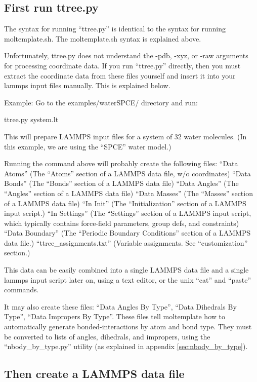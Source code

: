 \documentclass[11pt]{article}
\begin{document}
\subsection{First run ttree.py}

The syntax for running ``ttree.py'' is identical to the syntax for running
moltemplate.sh.  The moltemplate.sh syntax is explained above.

Unfortunately, ttree.py does not understand the -pdb, -xyz, or -raw arguments
for processing coordinate data.  If you run ``ttree.py'' directly, then you
must extract the coordinate data from these files yourself and insert it into 
your lammps input files manually.  This is explained below.

Example:
Go to the examples/waterSPCE/ directory and run:

ttree.py system.lt

This will prepare LAMMPS input files for a system of 32 water molecules.
(In this example, we are using the ``SPCE'' water model.)

Running the command above will probably create the following files:
``Data Atoms''  (The ``Atoms'' section of a LAMMPS data file, w/o coordinates)
``Data Bonds''  (The ``Bonds'' section of a LAMMPS data file)
``Data Angles'' (The ``Angles'' section of a LAMMPS data file)
``Data Masses'' (The ``Masses'' section of a LAMMPS data file)
``In Init''   (The ``Initialization'' section of a LAMMPS input script.)
``In Settings'' (The ``Settings'' section of a LAMMPS input script, which typically
            contains force-field parameters, group defs, and constraints)
``Data Boundary''    (The ``Periodic Boundary Conditions'' section of a LAMMPS data file.)
``ttree\_assignments.txt'' (Variable assignments. See ``customization'' section.)


This data can be easily combined into a single LAMMPS data file and a 
single lammps input script later on, using a text editor, or the unix
``cat'' and ``paste'' commands.

It may also create these files:
``Data Angles By Type'',
``Data Dihedrals By Type'',
``Data Impropers By Type''.
These files tell moltemplate how to automatically generate bonded-interactions
by atom and bond type.  They must be converted to lists of 
angles, dihedrals, and impropers, using the ``nbody\_by\_type.py'' utility
(as explained in appendix \ref{sec:nbody_by_type}).


\subsection{Then create a LAMMPS data file}
\end{document}
